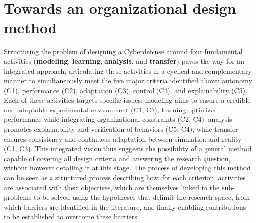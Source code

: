 \section{Towards an organizational design method}

Structuring the problem of designing a Cyberdefense  around four fundamental activities (\textbf{modeling}, \textbf{learning}, \textbf{analysis}, and \textbf{transfer}) paves the way for an integrated approach, articulating these activities in a cyclical and complementary manner to simultaneously meet the five major criteria identified above: autonomy (C1), performance (C2), adaptation (C3), control (C4), and explainability (C5). Each of these activities targets specific issues: modeling aims to ensure a credible and adaptable experimental environment (C1, C3), learning optimizes performance while integrating organizational constraints (C2, C4), analysis promotes explainability and verification of behaviors (C5, C4), while transfer ensures consistency and continuous adaptation between simulation and reality (C1, C3).
%
This integrated vision thus suggests the possibility of a general method capable of covering all design criteria and answering the research question, without however detailing it at this stage. The process of developing this method can be seen as a structured process describing how, for each criterion, activities are associated with their objectives, which are themselves linked to the sub-problems to be solved using the hypotheses that delimit the research space, from which barriers are identified in the literature, and finally enabling contributions to be established to overcome these barriers.

